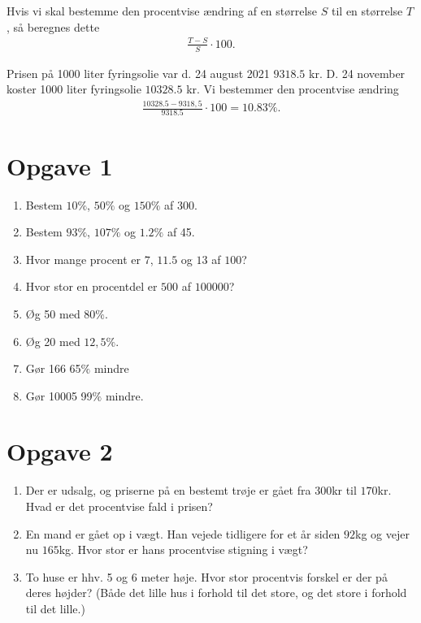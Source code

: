 \begin{regel}[Procentregneregel 4]
Hvis vi skal bestemme den procentvise ændring af en størrelse $S$ til en størrelse $T$, så beregnes dette 
\begin{align*}
\frac{T-S}{S}\cdot 100.
\end{align*}
\end{regel}
\begin{exa}
Prisen på 1000 liter fyringsolie var d. 24 august 2021 $9318.5$ kr. D. 24 november koster 1000 liter fyringsolie $10328.5$ kr. Vi bestemmer den procentvise ændring
\begin{align*}
\frac{10328.5-9318,5}{9318.5}\cdot 100 = 10.83\%. 
\end{align*}
\end{exa}
\section*{Opgave 1}
\begin{enumerate}[label=\roman*)]
\item Bestem $10\%$, $50\%$ og $150\%$ af $300$.
\item Bestem $93\%$, $107\%$ og $1.2\%$ af 45.
\item Hvor mange procent er $7$, $11.5$ og $13$ af $100$?
\item Hvor stor en procentdel er $500$ af $100000$?
\item Øg 50 med $80\%$. 
\item Øg 20 med $12,5\%$.
\item Gør 166 65$\%$ mindre
\item Gør 10005 99$\%$ mindre.
\end{enumerate}
\section*{Opgave 2}
\begin{enumerate}[label=\roman*)]
\item Der er udsalg, og priserne på en bestemt trøje er gået fra 300kr til $170$kr. Hvad er det procentvise fald i prisen?
\item En mand er gået op i vægt. Han vejede tidligere for et år siden $92$kg og vejer nu $165$kg. Hvor stor er hans procentvise stigning i vægt?
\item  To huse er  hhv. 5 og 6 meter høje. Hvor stor procentvis forskel er der på deres højder? (Både det lille hus i forhold til det store, og det store i forhold til det lille.)
\end{enumerate}

